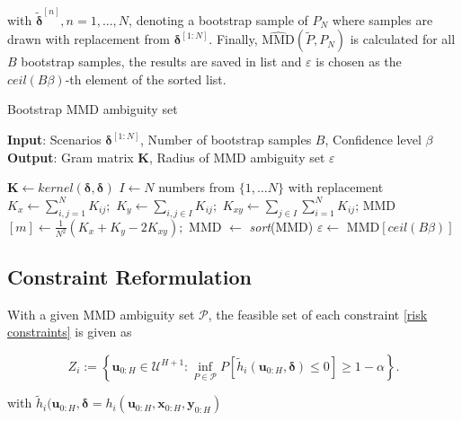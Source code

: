 with $\tilde{\boldsymbol{\delta}}^{[n]}, n = 1,...,N$, denoting a bootstrap sample of $P_N$ where samples are drawn with replacement from $\boldsymbol{\delta}^{[1:N]}$. Finally, $\widehat{\text{MMD}} (\tilde{P}, P_N)$ is calculated for all $B$ bootstrap samples, the results are saved in list and $\varepsilon$ is chosen as the $\textit{ceil}(B \beta)$-th element of the sorted list. 


\begin{algorithm}
	\caption{Bootstrap MMD ambiguity set}
	\label{alg:Bootstrap}
	\hspace*{\algorithmicindent} \textbf{Input}: Scenarios $ \boldsymbol{\delta}^{[1:N]} $, Number of bootstrap samples $B$, Confidence level $\beta$ \\
	\hspace*{\algorithmicindent} \textbf{Output}: Gram matrix $\boldsymbol{K}$, Radius of MMD ambiguity set $\varepsilon$
	\begin{algorithmic}[1]
		\State $\boldsymbol{K} \gets \textit{kernel}(\boldsymbol{\delta}, \boldsymbol{\delta})$
			\State $I \gets N$ numbers from $\{1, \dots N \}$ with replacement
			\State $K_x \gets \sum_{i,j = 1}^N K_{ij};$
			\State $K_y \gets \sum_{i,j \in I} K_{ij};$
			\State $K_{xy} \gets \sum_{j \in I} \sum_{i = 1}^N K_{ij}$;
			\State MMD$[m] \gets \frac{1}{N^2} \left( K_x + K_y - 2 K_{xy} \right) ;$
		\EndFor
		\State MMD $\gets$ \textit{sort}(MMD)
		\State $\varepsilon \gets$ MMD$\left[ \textit{ceil} (B \beta) \right]$
	\end{algorithmic}
\end{algorithm}

\subsection{Constraint Reformulation}

With a given MMD ambiguity set $\mathcal{P}$, the feasible set of each constraint \ref{risk constraints} is given as

\begin{equation} \label{feasible set}
	Z_i :=  \left\{ \boldsymbol{u}_{0:H} \in \mathcal{U}^{H+1} : \inf\limits_{P \in \mathcal{P}}P \left[ \tilde{h}_i(\boldsymbol{u}_{0:H},  \boldsymbol{\delta}) \leq 0 \right] \geq 1 - \alpha \right\}.
\end{equation}

with $\tilde{h}_i(\boldsymbol{u}_{0:H},  \boldsymbol{\delta} =  h_i(\boldsymbol{u}_{0:H},  \boldsymbol{x}_{0:H},  \boldsymbol{y}_{0:H})$

